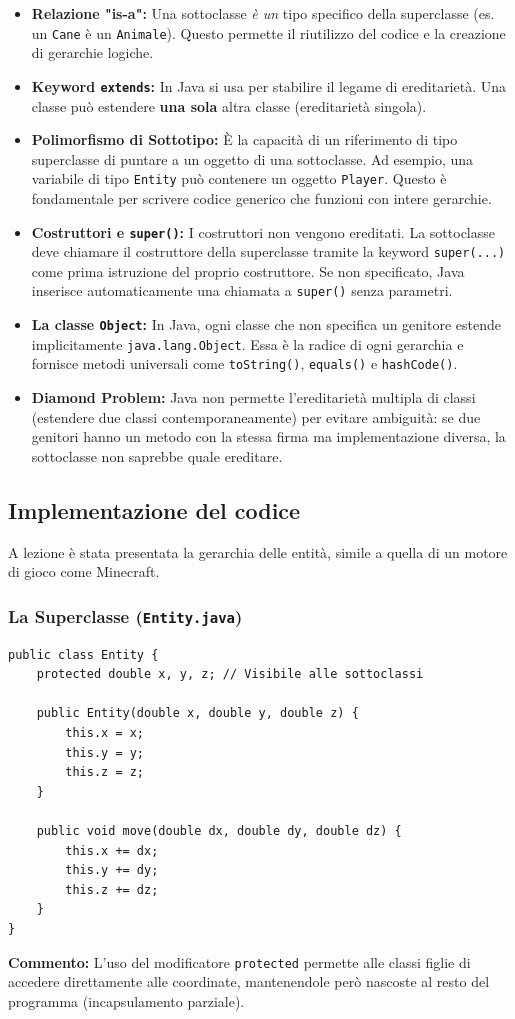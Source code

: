 \documentclass[12pt, a4paper]{article}
\begin{document}
\begin{itemize}
    \item \textbf{Relazione "is-a":} Una sottoclasse \textit{è un} tipo specifico della superclasse (es. un \texttt{Cane} è un \texttt{Animale}). Questo permette il riutilizzo del codice e la creazione di gerarchie logiche.
    \item \textbf{Keyword \texttt{extends}:} In Java si usa per stabilire il legame di ereditarietà. Una classe può estendere \textbf{una sola} altra classe (ereditarietà singola).
    \item \textbf{Polimorfismo di Sottotipo:} È la capacità di un riferimento di tipo superclasse di puntare a un oggetto di una sottoclasse. Ad esempio, una variabile di tipo \texttt{Entity} può contenere un oggetto \texttt{Player}. Questo è fondamentale per scrivere codice generico che funzioni con intere gerarchie.
    \item \textbf{Costruttori e \texttt{super()}:} I costruttori non vengono ereditati. La sottoclasse deve chiamare il costruttore della superclasse tramite la keyword \texttt{super(...)} come prima istruzione del proprio costruttore. Se non specificato, Java inserisce automaticamente una chiamata a \texttt{super()} senza parametri.
    \item \textbf{La classe \texttt{Object}:} In Java, ogni classe che non specifica un genitore estende implicitamente \texttt{java.lang.Object}. Essa è la radice di ogni gerarchia e fornisce metodi universali come \texttt{toString()}, \texttt{equals()} e \texttt{hashCode()}.
    \item \textbf{Diamond Problem:} Java non permette l'ereditarietà multipla di classi (estendere due classi contemporaneamente) per evitare ambiguità: se due genitori hanno un metodo con la stessa firma ma implementazione diversa, la sottoclasse non saprebbe quale ereditare.
\end{itemize}

\newpage

\subsection{Implementazione del codice}
A lezione è stata presentata la gerarchia delle entità, simile a quella di un motore di gioco come Minecraft.

\subsubsection{La Superclasse (\texttt{Entity.java})}
\begin{verbatim}
public class Entity {
    protected double x, y, z; // Visibile alle sottoclassi

    public Entity(double x, double y, double z) {
        this.x = x;
        this.y = y;
        this.z = z;
    }

    public void move(double dx, double dy, double dz) {
        this.x += dx;
        this.y += dy;
        this.z += dz;
    }
}
\end{verbatim}
\textbf{Commento:} L'uso del modificatore \texttt{protected} permette alle classi figlie di accedere direttamente alle coordinate, mantenendole però nascoste al resto del programma (incapsulamento parziale).
\end{document}
